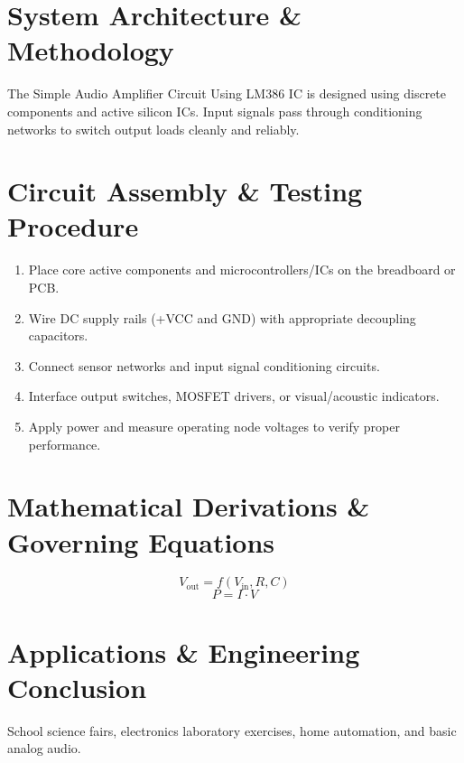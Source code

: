 \documentclass[11pt,a4paper]{article}
\begin{document}
\section{System Architecture \& Methodology}
The Simple Audio Amplifier Circuit Using LM386 IC is designed using discrete components and active silicon ICs. Input signals pass through conditioning networks to switch output loads cleanly and reliably.

\section{Circuit Assembly \& Testing Procedure}
\begin{enumerate}
    \item Place core active components and microcontrollers/ICs on the breadboard or PCB.
    \item Wire DC supply rails (+VCC and GND) with appropriate decoupling capacitors.
    \item Connect sensor networks and input signal conditioning circuits.
    \item Interface output switches, MOSFET drivers, or visual/acoustic indicators.
    \item Apply power and measure operating node voltages to verify proper performance.
\end{enumerate}

\section{Mathematical Derivations \& Governing Equations}
\begin{equation}
V_{\text{out}} = f(V_{\text{in}}, R, C)
\end{equation}
\begin{equation}
P = I \cdot V
\end{equation}

\section{Applications \& Engineering Conclusion}
School science fairs, electronics laboratory exercises, home automation, and basic analog audio.
\end{document}
